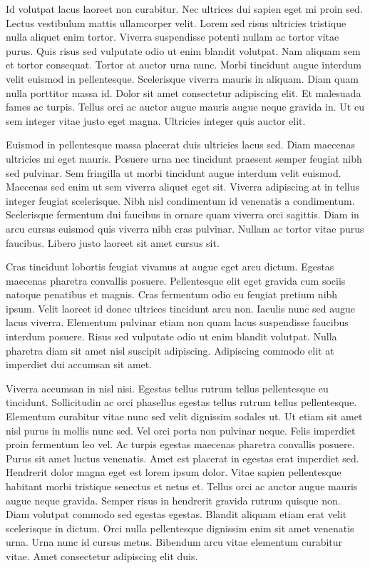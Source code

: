 \documentclass[11pt,a4paper]{article}
\begin{document}
Id volutpat lacus laoreet non curabitur. Nec ultrices dui sapien eget mi proin sed. Lectus vestibulum mattis ullamcorper velit. Lorem sed risus ultricies tristique nulla aliquet enim tortor. Viverra suspendisse potenti nullam ac tortor vitae purus. Quis risus sed vulputate odio ut enim blandit volutpat. Nam aliquam sem et tortor consequat. Tortor at auctor urna nunc. Morbi tincidunt augue interdum velit euismod in pellentesque. Scelerisque viverra mauris in aliquam. Diam quam nulla porttitor massa id. Dolor sit amet consectetur adipiscing elit. Et malesuada fames ac turpis. Tellus orci ac auctor augue mauris augue neque gravida in. Ut eu sem integer vitae justo eget magna. Ultricies integer quis auctor elit.

Euismod in pellentesque massa placerat duis ultricies lacus sed. Diam maecenas ultricies mi eget mauris. Posuere urna nec tincidunt praesent semper feugiat nibh sed pulvinar. Sem fringilla ut morbi tincidunt augue interdum velit euismod. Maecenas sed enim ut sem viverra aliquet eget sit. Viverra adipiscing at in tellus integer feugiat scelerisque. Nibh nisl condimentum id venenatis a condimentum. Scelerisque fermentum dui faucibus in ornare quam viverra orci sagittis. Diam in arcu cursus euismod quis viverra nibh cras pulvinar. Nullam ac tortor vitae purus faucibus. Libero justo laoreet sit amet cursus sit.

Cras tincidunt lobortis feugiat vivamus at augue eget arcu dictum. Egestas maecenas pharetra convallis posuere. Pellentesque elit eget gravida cum sociis natoque penatibus et magnis. Cras fermentum odio eu feugiat pretium nibh ipsum. Velit laoreet id donec ultrices tincidunt arcu non. Iaculis nunc sed augue lacus viverra. Elementum pulvinar etiam non quam lacus suspendisse faucibus interdum posuere. Risus sed vulputate odio ut enim blandit volutpat. Nulla pharetra diam sit amet nisl suscipit adipiscing. Adipiscing commodo elit at imperdiet dui accumsan sit amet.

Viverra accumsan in nisl nisi. Egestas tellus rutrum tellus pellentesque eu tincidunt. Sollicitudin ac orci phasellus egestas tellus rutrum tellus pellentesque. Elementum curabitur vitae nunc sed velit dignissim sodales ut. Ut etiam sit amet nisl purus in mollis nunc sed. Vel orci porta non pulvinar neque. Felis imperdiet proin fermentum leo vel. Ac turpis egestas maecenas pharetra convallis posuere. Purus sit amet luctus venenatis. Amet est placerat in egestas erat imperdiet sed. Hendrerit dolor magna eget est lorem ipsum dolor. Vitae sapien pellentesque habitant morbi tristique senectus et netus et. Tellus orci ac auctor augue mauris augue neque gravida. Semper risus in hendrerit gravida rutrum quisque non. Diam volutpat commodo sed egestas egestas. Blandit aliquam etiam erat velit scelerisque in dictum. Orci nulla pellentesque dignissim enim sit amet venenatis urna. Urna nunc id cursus metus. Bibendum arcu vitae elementum curabitur vitae. Amet consectetur adipiscing elit duis.
\end{document}
